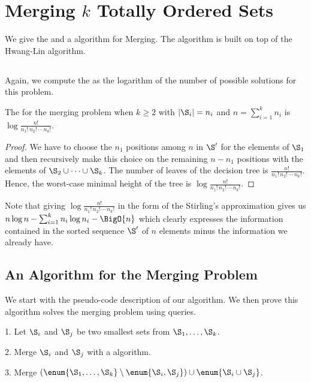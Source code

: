 \section{Merging $k$ Totally Ordered Sets}
\label{tree:merging:kgeq3}

We give the \ITLB and a \BigO{\ITLB} algorithm for Merging. The
algorithm is built on top of the Hwang-Lin algorithm.

\subsection{\ITLB}
\label{tree:merging:kgeq3:ITLB}

Again, we compute the \ITLB as the logarithm of the number of possible solutions
for this problem.
\begin{theorem}
The \ITLB for the merging problem when $k \ge 2$ with $|\S_i| = n_i$ and $n =
\sum_{i=1}^{k} n_i$ is \(\log \frac{n!}{n_1! \, n_2! \, \cdots \, n_k!}\).
\end{theorem}
\begin{proof}
We have to choose the $n_1$ positions among $n$ in $\S'$ for the elements of
$\S_1$ and then recursively make this choice on the remaining $n - n_1$
positions with the elements of \(\S_2 \cup \dots \cup \S_k\). The number of
leaves of the decision tree is $\frac{n!}{n_1! \, n_2! \, \cdots \, n_k!}$. Hence, the
worst-case minimal height of the tree is $\log \frac{n!}{n_1! \, n_2! \, \cdots
\, n_k!}$.
\end{proof}

Note that giving $\log \frac{n!}{n_1! \, n_2! \, \cdots \, n_k!}$ in the form of the
Stirling's approximation gives us \(n \log n - \sum_{i=1}^{k} n_i \log n_i -
\BigO{n}\)
which clearly expresses the information contained in the sorted sequence $\S'$ of
$n$ elements minus the information we already have.

\subsection{An Algorithm for the Merging Problem}
\label{tree:merging:kgeq3:alg}

We start with the pseudo-code description of our algorithm. We then prove this
algorithm solves the merging problem using \BigO{\ITLB} queries.
\begin{algorithm}
\item[1.] Let \(\S_i\) and \(\S_j\) be two smallest sets from \(\S_1 ,
\dots , \S_k\).
\item[2.] Merge \(\S_i\) and \(\S_j\) with a \BigO{\ITLB} algorithm.
\item[3.] Merge \((\enum{\S_1 , \dots , \S_k} \setminus \enum{\S_i,\S_j} )
\cup \enum{\S_i \cup \S_j}\).
\end{algorithm}

